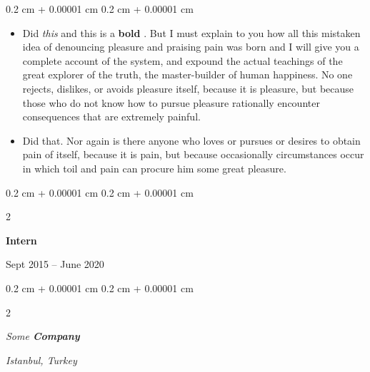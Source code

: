 \documentclass[10pt, letterpaper]{article}
\newenvironment{highlights}{
    \begin{itemize}[
        topsep=0.10 cm,
        parsep=0.10 cm,
        partopsep=0pt,
        itemsep=0pt,
        leftmargin=0.4 cm + 10pt
    ]
}{
    \end{itemize}
} %
\newenvironment{onecolentry}{
    \begin{adjustwidth}{
        0.2 cm + 0.00001 cm
    }{
        0.2 cm + 0.00001 cm
    }
}{
    \end{adjustwidth}
} %
\newenvironment{twocolentry}[2][]{
    \onecolentry
    \def\secondColumn{#2}
    \setcolumnwidth{\fill, 4.5 cm}
    \begin{paracol}{2}
}{
    \switchcolumn \raggedleft \secondColumn
    \end{paracol}
    \endonecolentry
} %
\let\hrefWithoutArrow\href
\renewcommand{\href}[2]{\hrefWithoutArrow{#1}{\ifthenelse{\equal{#2}{}}{ }{#2 }\raisebox{.15ex}{\footnotesize \faExternalLink*}}}
\begin{document}
        \vspace{0.10 cm}
        \begin{onecolentry}
            \begin{highlights}
                \item Did \textit{this} and this is a \textbf{bold} \href{https://example.com}{link}. But I must explain to you how all this mistaken idea of denouncing pleasure and praising pain was born and I will give you a complete account of the system, and expound the actual teachings of the great explorer of the truth, the master-builder of human happiness. No one rejects, dislikes, or avoids pleasure itself, because it is pleasure, but because those who do not know how to pursue pleasure rationally encounter consequences that are extremely painful.
                \item Did that. Nor again is there anyone who loves or pursues or desires to obtain pain of itself, because it is pain, but because occasionally circumstances occur in which toil and pain can procure him some great pleasure.
            \end{highlights}
        \end{onecolentry}


        \vspace{0.2 cm}

                \begin{twocolentry}{
                    Sept 2015 – June 2020
                }
                \textbf{Intern}
                \end{twocolentry}
            \begin{twocolentry}{
        \textit{Istanbul, Turkey}    }
            \textit{Some \textbf{Company}}
            \end{twocolentry}



        \vspace{0.2 cm}
\end{document}
